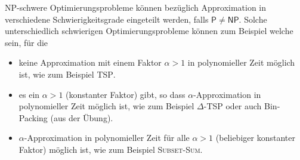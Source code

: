 \textsf{NP}-schwere Optimierungsprobleme können bezüglich Approximation in verschiedene Schwierigkeitsgrade eingeteilt werden, falls $\mathsf{P} \neq \mathsf{NP}$. Solche unterschiedlich schwierigen Optimierungsprobleme können zum Beispiel welche sein, für die
\begin{itemize}
  \item keine Approximation mit einem Faktor $\alpha > 1$ in polynomieller Zeit möglich ist, wie zum Beispiel \textsc{TSP}.
  \item es ein $\alpha > 1$ (konstanter Faktor) gibt, so dass $\alpha$-Approximation in polynomieller Zeit möglich ist, wie zum Beispiel \textsc{$\varDelta$-TSP} oder auch Bin-Packing (aus der Übung).
  \item $\alpha$-Approximation in polynomieller Zeit für alle $\alpha > 1$ (beliebiger konstanter Faktor) möglich ist, wie zum Beispiel \textsc{Subset-Sum}.
\end{itemize}
%
%
%


